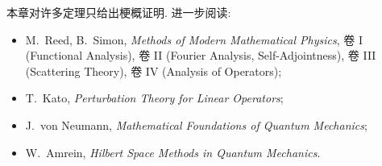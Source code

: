 \begin{remark}[读者建议]
本章对许多定理只给出梗概证明. 进一步阅读:
\begin{itemize}
    \item M.\ Reed, B.\ Simon, \emph{Methods of Modern Mathematical Physics}, 卷 I (Functional Analysis), 卷 II (Fourier Analysis, Self-Adjointness), 卷 III (Scattering Theory), 卷 IV (Analysis of Operators);
    \item T.\ Kato, \emph{Perturbation Theory for Linear Operators};
    \item J.\ von Neumann, \emph{Mathematical Foundations of Quantum Mechanics};
    \item W.\ Amrein, \emph{Hilbert Space Methods in Quantum Mechanics}.
\end{itemize}
\end{remark}
